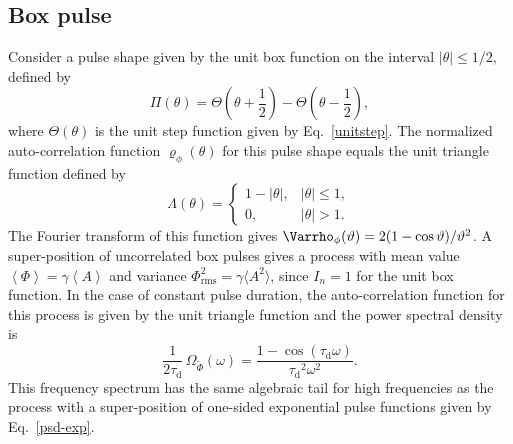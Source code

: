 \documentclass[aps,prb,12pt,a4paper,preprint,amsmath,amssymb,groupedaddress]{revtex4-1}
\newcommand{\ave}[1]{{\left<#1\right>}}
\newcommand{\abs}[1]{{\left|#1\right|}}\newcommand{\order}[1]{{\mathcal{O}\left(#1\right)}}
\newcommand{\taud}{\ensuremath{\tau_\text{d}}}
\newcommand{\Phiave}{\ensuremath{\ave{\Phi}}}
\newcommand{\Phirms}{\ensuremath{\Phi}_\text{rms}}
\newcommand{\Phiwt}{\ensuremath{\widetilde{\Phi}}}
\newcommand{\Aave}{\ensuremath{\ave{A}}}
\newcommand{\Eqref}[1]{Eq.~\eqref{#1}}
\begin{document}
\subsection{Box pulse}\label{sec:box}



Consider a pulse shape given by the unit box function on the interval $\abs{\theta}\leq1/2$, defined by
\begin{equation}\label{phi-box}
\Pi(\theta) = \Theta\left(\theta+\frac{1}{2} \right) - \Theta\left( \theta-\frac{1}{2} \right) ,
\end{equation}
where $\Theta(\theta)$ is the unit step function given by \Eqref{unitstep}. The normalized auto-correlation function $\varrho_\phi(\theta)$ for this pulse shape equals the unit triangle function defined by
\begin{equation}\label{phi-triangle}
\Lambda(\theta) =
\begin{cases}
1-\abs{\theta}, & \abs{\theta} \leq 1 ,
\\
0, & \abs{\theta} > 1 .
\end{cases}
\end{equation}
The Fourier transform of this function gives $\Varrho_\phi(\vartheta)=2(1-\cos{\vartheta})/\vartheta^2$. A super-position of uncorrelated box pulses gives a process with mean value $\Phiave=\gamma\Aave$ and variance $\Phirms^2=\gamma\langle{A^2}\rangle$, since $I_n=1$ for the unit box function. In the case of constant pulse duration, the auto-correlation function for this process is given by the unit triangle function and the power spectral density is
\begin{equation}\label{psd-box}
\frac{1}{2\taud}\,\Omega_{\Phiwt}(\omega) = \frac{1-\cos(\taud\omega)}{\taud^2\omega^2} .
\end{equation}
This frequency spectrum has the same algebraic tail for high frequencies as the process with a super-position of one-sided exponential pulse functions given by \Eqref{psd-exp}. 
\end{document}
